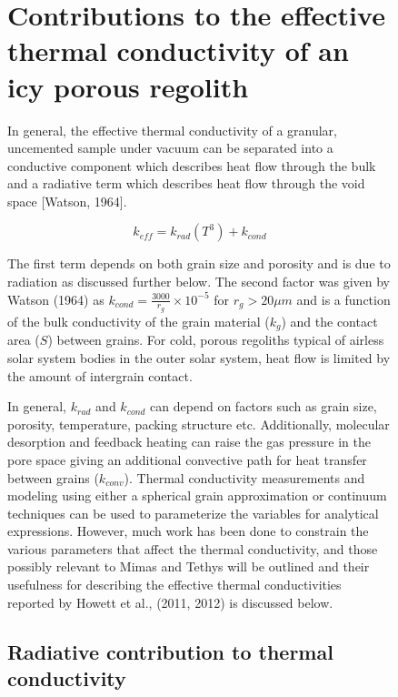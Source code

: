 \documentclass[11pt]{article} %
\begin{document}
\begin{figure}[ht]
\section{Contributions to the effective thermal conductivity of an icy porous regolith}

	In general, the effective thermal conductivity of a granular, uncemented sample under vacuum can be separated into a conductive component which describes heat flow through the bulk and a radiative term which describes heat flow through the void space [Watson, 1964]. 
	
	\begin{equation} \label{eq:TCbasic}
	k_{eff} = k_{rad}(T^{3}) + k_{cond}
	\end{equation} 
	
	The first term depends on both grain size and porosity and is due to radiation as discussed further below. The second factor was given by Watson (1964) as $k_{cond} = \frac{3000}{r_{g}}\times10^{-5}$ for $r_{g} > 20 \mu m$ and is a function of the bulk conductivity of the grain material ($k_{g}$) and the contact area ($S$) between grains. For cold, porous regoliths typical of airless solar system bodies in the outer solar system, heat flow is limited by the amount of intergrain contact.

	In general, $k_{rad}$ and $k_{cond}$ can depend on factors such as grain size, porosity, temperature, packing structure etc. Additionally, molecular desorption and feedback heating can raise the gas pressure in the pore space giving an additional convective path for heat transfer between grains ($k_{conv}$). Thermal conductivity measurements and modeling using either a spherical grain approximation or continuum techniques can be used to parameterize the variables for analytical expressions. However, much work has been done to constrain the various parameters that affect the thermal conductivity, and those possibly relevant to Mimas and Tethys will be outlined and their usefulness for describing the effective thermal conductivities reported by Howett et al., (2011, 2012) is discussed below.
	

\subsection{Radiative contribution to thermal conductivity}


\end{figure}
\end{document}
